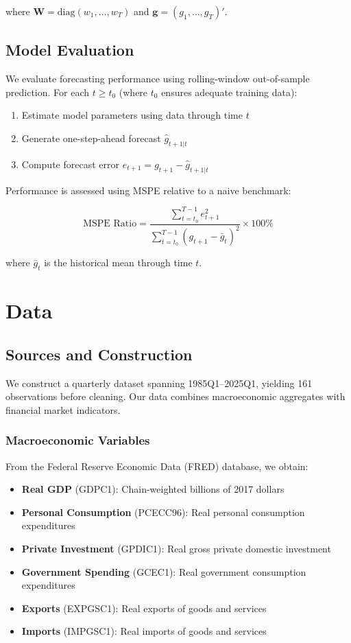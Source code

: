 \documentclass[11pt,letterpaper]{article}
\newcommand{\diag}{\mathrm{diag}}
\theoremstyle{plain}
\theoremstyle{definition}
\theoremstyle{remark}
\begin{document}
where $\bm{W} = \diag(w_1, \ldots, w_T)$ and $\bm{g} = (g_1, \ldots, g_T)'$.

\subsection{Model Evaluation}

We evaluate forecasting performance using rolling-window out-of-sample prediction. For each $t \geq t_0$ (where $t_0$ ensures adequate training data):

\begin{enumerate}
\item Estimate model parameters using data through time $t$
\item Generate one-step-ahead forecast $\hat{g}_{t+1|t}$
\item Compute forecast error $e_{t+1} = g_{t+1} - \hat{g}_{t+1|t}$
\end{enumerate}

Performance is assessed using MSPE relative to a naive benchmark:

\begin{equation}
\text{MSPE Ratio} = \frac{\sum_{t=t_0}^{T-1} e_{t+1}^2}{\sum_{t=t_0}^{T-1} (g_{t+1} - \bar{g}_t)^2} \times 100\%
\label{eq:mspe}
\end{equation}

where $\bar{g}_t$ is the historical mean through time $t$.

\section{Data}

\subsection{Sources and Construction}

We construct a quarterly dataset spanning 1985Q1--2025Q1, yielding 161 observations before cleaning. Our data combines macroeconomic aggregates with financial market indicators.

\subsubsection{Macroeconomic Variables}

From the Federal Reserve Economic Data (FRED) database, we obtain:

\begin{itemize}
\item \textbf{Real GDP} (GDPC1): Chain-weighted billions of 2017 dollars
\item \textbf{Personal Consumption} (PCECC96): Real personal consumption expenditures
\item \textbf{Private Investment} (GPDIC1): Real gross private domestic investment
\item \textbf{Government Spending} (GCEC1): Real government consumption expenditures
\item \textbf{Exports} (EXPGSC1): Real exports of goods and services
\item \textbf{Imports} (IMPGSC1): Real imports of goods and services
\end{itemize}
\end{document}
